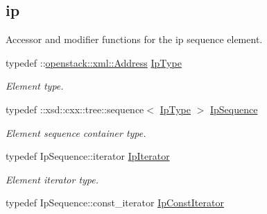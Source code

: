 \subsection*{ip}
\label{_amgrp957b527bcfbad2e80f58d20683931435}
Accessor and modifier functions for the ip sequence element. \begin{DoxyCompactItemize}
\item 
\hypertarget{classopenstack_1_1xml_1_1AddressList_a4090b1cdc5d57ecfa34622066faa6eab}{
typedef ::\hyperlink{classopenstack_1_1xml_1_1Address}{openstack::xml::Address} \hyperlink{classopenstack_1_1xml_1_1AddressList_a4090b1cdc5d57ecfa34622066faa6eab}{IpType}}
\label{classopenstack_1_1xml_1_1AddressList_a4090b1cdc5d57ecfa34622066faa6eab}

\begin{DoxyCompactList}\small\item\em Element type. \item\end{DoxyCompactList}\item 
\hypertarget{classopenstack_1_1xml_1_1AddressList_ac04d0089c0ec07b9d63eb6ea5bb1bdf4}{
typedef ::xsd::cxx::tree::sequence$<$ \hyperlink{classopenstack_1_1xml_1_1Address}{IpType} $>$ \hyperlink{classopenstack_1_1xml_1_1AddressList_ac04d0089c0ec07b9d63eb6ea5bb1bdf4}{IpSequence}}
\label{classopenstack_1_1xml_1_1AddressList_ac04d0089c0ec07b9d63eb6ea5bb1bdf4}

\begin{DoxyCompactList}\small\item\em Element sequence container type. \item\end{DoxyCompactList}\item 
\hypertarget{classopenstack_1_1xml_1_1AddressList_a4079a9b273a076e6f605cd658f372847}{
typedef IpSequence::iterator \hyperlink{classopenstack_1_1xml_1_1AddressList_a4079a9b273a076e6f605cd658f372847}{IpIterator}}
\label{classopenstack_1_1xml_1_1AddressList_a4079a9b273a076e6f605cd658f372847}

\begin{DoxyCompactList}\small\item\em Element iterator type. \item\end{DoxyCompactList}\item 
\hypertarget{classopenstack_1_1xml_1_1AddressList_a2f47ee05f9a355bbc1920ab070c15082}{
typedef IpSequence::const\_\-iterator \hyperlink{classopenstack_1_1xml_1_1AddressList_a2f47ee05f9a355bbc1920ab070c15082}{IpConstIterator}}
\label{classopenstack_1_1xml_1_1AddressList_a2f47ee05f9a355bbc1920ab070c15082}


\end{DoxyCompactItemize}
